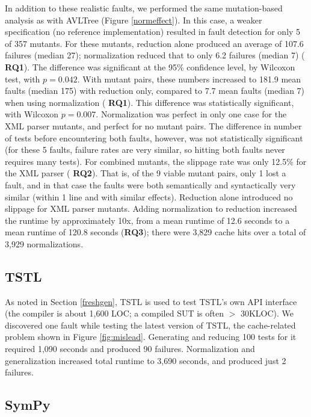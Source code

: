 In addition to these realistic faults, we performed the same
mutation-based analysis as with AVLTree (Figure \ref{normeffect}). In
this case, a weaker specification (no reference implementation)
resulted in fault detection for only 5 of 357 mutants.  For these
mutants, reduction alone produced an average of 107.6 failures (median
27); normalization reduced that to only 6.2 failures (median 7) ({\bf
  RQ1}).  The difference was significant at the 95\% confidence level,
by Wilcoxon test, with $p=0.042$.  With mutant pairs, these numbers
increased to 181.9 mean faults (median 175) with reduction only,
compared to 7.7 mean faults (median 7) when using normalization ({\bf
  RQ1}).  This difference was statistically significant, with Wilcoxon
$p=0.007$.  Normalization was perfect in only one case for
the XML parser mutants, and perfect for no mutant pairs.  The
difference in number of tests before encountering both faults,
however, was not statistically significant (for these 5 faults,
failure rates are very similar, so hitting both faults never requires
many tests).  For combined
mutants, the slippage rate was only 12.5\% for the XML parser ({\bf
  RQ2}).  That is, of the 9 viable mutant pairs, only 1 lost a fault,
and in that case the faults were both semantically and syntactically
very similar (within 1 line and with similar effects).  Reduction alone introduced no slippage for XML parser
mutants.  Adding normalization to reduction increased the runtime by
approximately 10x, from a mean runtime of 12.6 seconds to a mean
runtime of 120.8 seconds ({\bf RQ3}); there were 3,829 cache hits over
a total of 3,929 normalizations.

\subsection{TSTL}

As noted in Section \ref{freshgen}, TSTL is used to test TSTL's own
API interface (the compiler is about 1,600 LOC; a compiled SUT is
often $>$ 30KLOC).  We discovered one fault while testing
the latest version of TSTL, the cache-related problem shown in Figure \ref{fig:mislead}.
Generating and reducing 100 tests for it required 1,090 seconds
and produced 90 failures.  Normalization and generalization
increased total runtime to 3,690 seconds, and produced just 2
failures.

\subsection{SymPy}

